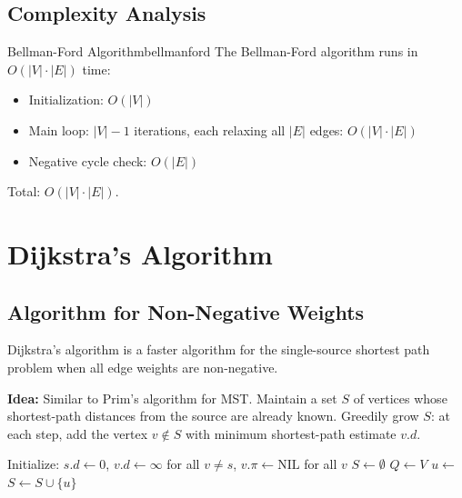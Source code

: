 \subsection{Complexity Analysis}

\begin{complexity}{Bellman-Ford Algorithm}{bellmanford}
The Bellman-Ford algorithm runs in $O(|V| \cdot |E|)$ time:
\begin{itemize}[noitemsep]
  \item Initialization: $O(|V|)$
  \item Main loop: $|V|-1$ iterations, each relaxing all $|E|$ edges: $O(|V| \cdot |E|)$
  \item Negative cycle check: $O(|E|)$
\end{itemize}
Total: $O(|V| \cdot |E|)$.
\end{complexity}

\section*{Dijkstra's Algorithm}

\subsection{Algorithm for Non-Negative Weights}

Dijkstra's algorithm is a faster algorithm for the single-source shortest path problem when 
all edge weights are non-negative.

\textbf{Idea:} Similar to Prim's algorithm for MST. Maintain a set $S$ of vertices whose 
shortest-path distances from the source are already known. Greedily grow $S$: at each step, 
add the vertex $v \notin S$ with minimum shortest-path estimate $v.d$.

\begin{algorithm}[H]
\caption{Dijkstra's Algorithm}
\begin{algorithmic}[1]
  \State Initialize: $s.d \gets 0$, $v.d \gets \infty$ for all $v \neq s$, $v.\pi \gets \text{NIL}$ for all $v$
  \State $S \gets \emptyset$
  \State $Q \gets V$ 
    \State $u \gets$ 
    \State $S \gets S \cup \{u\}$
      \State {}
        \State {}
      \EndIf
    \EndFor
  \EndWhile
\EndProcedure
\end{algorithmic}
\end{algorithm}

